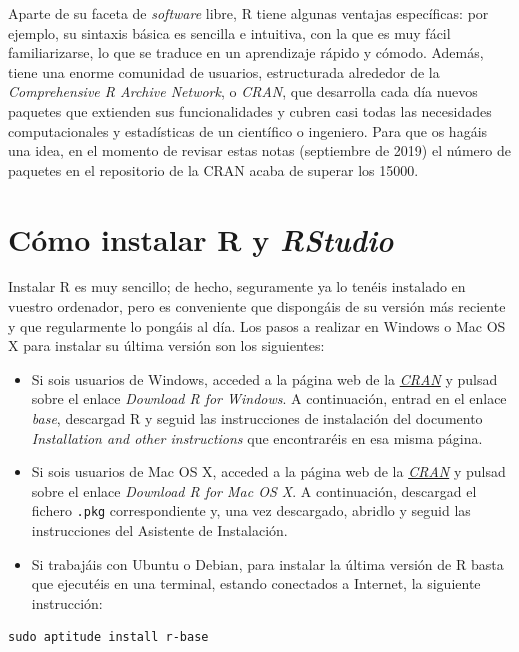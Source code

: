 \documentclass[]{book}
\theoremstyle{definition}
\theoremstyle{definition}
\theoremstyle{definition}
\theoremstyle{remark}
\begin{document}
Aparte de su faceta de \emph{software} libre, R tiene algunas ventajas específicas: por ejemplo, su sintaxis básica es sencilla e intuitiva, con la que es muy fácil familiarizarse, lo que se traduce en un aprendizaje rápido y cómodo. Además, tiene una enorme comunidad de usuarios, estructurada alrededor de la \emph{Comprehensive R Archive Network}, o \emph{CRAN}, que desarrolla cada día nuevos paquetes que extienden sus funcionalidades y cubren casi todas las necesidades computacionales y estadísticas de un científico o ingeniero. Para que os hagáis una idea, en el momento de revisar estas notas (septiembre de 2019) el número de paquetes en el repositorio de la CRAN acaba de superar los 15000.

\hypertarget{como-instalar-r-y-rstudio}{%
\section{\texorpdfstring{Cómo instalar R y \emph{RStudio}}{Cómo instalar R y RStudio}}\label{como-instalar-r-y-rstudio}}

Instalar R es muy sencillo; de hecho, seguramente ya lo tenéis instalado en vuestro ordenador, pero es conveniente que dispongáis de su versión más reciente y que regularmente lo pongáis al día. Los pasos a realizar en Windows o Mac OS X para instalar su última versión son los siguientes:

\begin{itemize}
\item
  Si sois usuarios de Windows, acceded a la página web de la \href{http://cran.r-project.org/}{\emph{CRAN}} y pulsad sobre el enlace \emph{Download R for Windows}. A continuación, entrad en el enlace \emph{base}, descargad R y seguid las instrucciones de instalación del documento \emph{Installation and other instructions} que encontraréis en esa misma página.
\item
  Si sois usuarios de Mac OS X, acceded a la página web de la \href{http://cran.r-project.org/}{\emph{CRAN}} y pulsad sobre el enlace \emph{Download R for Mac OS X}. A continuación, descargad el fichero \texttt{.pkg} correspondiente y, una vez descargado, abridlo y seguid las instrucciones del Asistente de Instalación.
\item
  Si trabajáis con Ubuntu o Debian, para instalar la última versión de R basta que ejecutéis en una terminal, estando conectados a Internet, la siguiente instrucción:
\end{itemize}

\begin{verbatim}
sudo aptitude install r-base
\end{verbatim}
\end{document}

